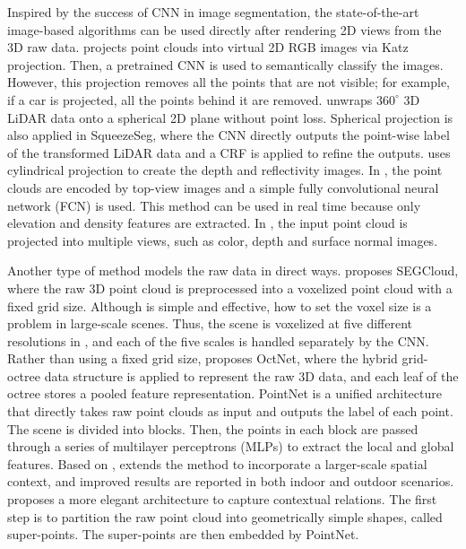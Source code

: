 Inspired by the success of CNN in image segmentation, the state-of-the-art image-based algorithms can be used directly after rendering 2D views from the 3D raw data. \cite{tosteberg2017semantic} projects point clouds into virtual 2D RGB images via Katz projection. Then, a pretrained CNN is used to semantically classify the images. However, this projection removes all the points that are not visible; for example, if a car is projected, all the points behind it are removed. \cite{dewan17iros} unwraps $360^\circ$ 3D LiDAR data onto a spherical 2D plane without point loss. Spherical projection is also applied in SqueezeSeg\cite{wu2017squeezeseg}, where the CNN directly outputs the point-wise label of the transformed LiDAR data and a CRF is applied to refine the outputs. \cite{piewak2018boosting} uses cylindrical projection to create the depth and reflectivity images. In \cite{caltagirone2017fast}, the point clouds are encoded by top-view images and a simple fully convolutional neural network (FCN) is used. This method can be used in real time because only elevation and density features are extracted. In \cite{lawin2017deep}, the input point cloud is projected into multiple views, such as color, depth and surface normal images. 

Another type of method models the raw data in direct ways. \cite{tchapmi2017segcloud} proposes SEGCloud, where the raw 3D point cloud is preprocessed into a voxelized point cloud with a fixed grid size. Although \cite{tchapmi2017segcloud} is simple and effective, how to set the voxel size is a problem in large-scale scenes. Thus, the scene is voxelized at five different resolutions in \cite{hackel2017isprs}, and each of the five scales is handled separately by the CNN. Rather than using a fixed grid size, \cite{riegler2017octnet} proposes OctNet, where the hybrid grid-octree data structure is applied to represent the raw 3D data, and each leaf of the octree stores a pooled feature representation. PointNet\cite{qi2017pointnet} is a unified architecture that directly takes raw point clouds as input and outputs the label of each point. The scene is divided into blocks. Then, the points in each block are passed through a series of multilayer perceptrons (MLPs) to extract the local and global features. Based on \cite{qi2017pointnet}, \cite{engelmann2017exploring} extends the method to incorporate a larger-scale spatial context, and improved results are reported in both indoor and outdoor scenarios. \cite{landrieu2017large} proposes a more elegant architecture to capture contextual relations. The first step is to partition the raw point cloud into geometrically simple shapes, called super-points. The super-points are then embedded by PointNet\cite{qi2017pointnet}.

